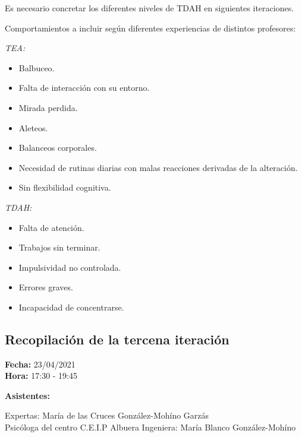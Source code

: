 \documentclass[letterpaper,12pt]{article}
\begin{document}
\begin{flushleft}
Es necesario concretar los diferentes niveles de TDAH en siguientes iteraciones.
\end{flushleft}

\begin{flushleft}
Comportamientos a incluir según diferentes experiencias de distintos profesores:
\end{flushleft}

\begin{flushleft}
\textit{TEA:}\\
\end{flushleft}
\begin{itemize}
\item Balbuceo.
\item Falta de interacción con su entorno.
\item Mirada perdida.
\item Aleteos.
\item Balanceos corporales.
\item Necesidad de rutinas diarias con malas reacciones derivadas de la alteración.
\item Sin flexibilidad cognitiva.
\end{itemize}
\begin{flushleft}

\textit{TDAH:}\\
\end{flushleft}
\begin{itemize}
\item Falta de atención.
\item Trabajos sin terminar.
\item Impulsividad no controlada.
\item Errores graves.
\item Incapacidad de concentrarse.

\end{itemize}

\subsection{Recopilación de la tercena iteración}
\begin{flushleft}
	\textbf{Fecha: }23/04/2021 \\
	\textbf{Hora: }17:30 - 19:45 \\
	
	\end{flushleft} 
	\begin{flushleft}
	\textbf{Asistentes: } \\
	\end{flushleft}
	Expertas: María de las Cruces González-Mohíno Garzás\\
			  Psicóloga del centro C.E.I.P Albuera
	Ingeniera: María Blanco González-Mohíno
	
\end{document}
